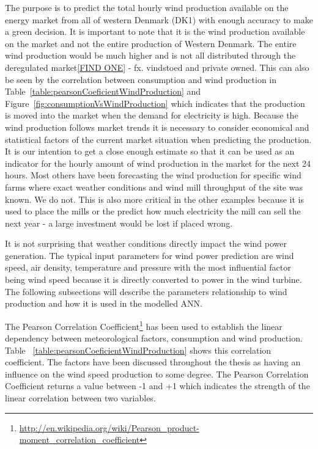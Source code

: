 The purpose is to predict the total hourly wind production available on the energy market from all of western Denmark (DK1) with enough accuracy to make a green decision. It is important to note that it is the wind production available on the market and not the entire production of Western Denmark. The entire wind production would be much higher and is not all distributed through the deregulated market\ref{FIND ONE} - fx. vindstoed and private owned. This can also be seen by the correlation between consumption and wind production in Table~\ref{table:pearsonCoeficientWindProduction} and Figure~\ref{fig:consumptionVsWindProduction} which indicates that the production is moved into the market when the demand for electricity is high. Because the wind production follows market trends it is necessary to consider economical and statistical factors of the current market situation when predicting the production. It is our intention to get a close enough estimate so that it can be used as an indicator for the hourly amount of wind production in the market for the next 24 hours.
Most others have been forecasting the wind production for specific wind farms where exact weather conditions and wind mill throughput of the site was known. We do not. This is also more critical in the other examples because it is used to place the mills or the predict how much electricity the mill can sell the next year - a large investment would be lost if placed wrong. 

It is not surprising that weather conditions directly impact the wind power generation. The typical input parameters for wind power prediction are wind speed, air density, temperature and pressure \cite{WindPowerGenerationUsingANN} with the most influential factor being wind speed because it is directly converted to power in the wind turbine. The following subsections will describe the parameters relationship to wind production and how it is used in the modelled ANN.

The Pearson Correlation Coefficient\footnote{\url{http://en.wikipedia.org/wiki/Pearson_product-moment_correlation_coefficient}} has been used to establish the linear dependency between meteorological factors, consumption and wind production. Table ~\ref{table:pearsonCoeficientWindProduction} shows this correlation coefficient. The factors have been discussed throughout the thesis as having an influence on the wind speed production to some degree. The Pearson Correlation Coefficient returns a value between -1 and +1 which indicates the strength of the linear correlation between two variables.

